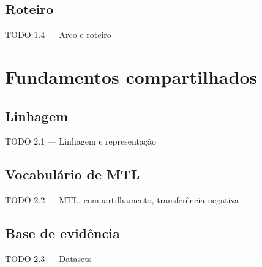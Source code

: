 \documentclass{beamer}
\begin{document}
\subsection{Roteiro}
\begin{frame}{TODO 1.4 --- Arco e roteiro}
\end{frame}


\section[Fundamentos]{Fundamentos compartilhados}                                 %

\subsection{Linhagem}
\begin{frame}{TODO 2.1 --- Linhagem e representação}
\end{frame}

\subsection{Vocabulário de MTL}
\begin{frame}{TODO 2.2 --- MTL, compartilhamento, transferência negativa}
\end{frame}

\subsection{Base de evidência}
\begin{frame}{TODO 2.3 --- Datasets}
\end{frame}
\end{document}
